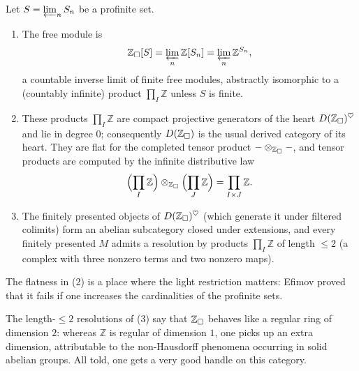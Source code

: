 \begin{proposition}
\label{prop:1:Zsolid-structure}
Let $S=\varprojlim_n S_n$ be a profinite set.
\begin{enumerate}
\item The free module is
\begin{equation}
\label{eq:1:Zsolid-free-module}
\mathbb{Z}_{\square}[S]=\varprojlim_n \mathbb{Z}[S_n]=\varprojlim_n \mathbb{Z}^{S_n},
\end{equation}
a countable inverse limit of finite free modules, abstractly isomorphic to a
(countably infinite) product $\prod_I\mathbb{Z}$ unless $S$ is finite.
\item These products $\prod_I\mathbb{Z}$ are compact projective generators of the
heart $D(\mathbb{Z}_{\square})^{\heartsuit}$ and lie in degree $0$; consequently $D(\mathbb{Z}_{\square})$
is the usual derived category of its heart. They are flat for the completed
tensor product $-\otimes_{\mathbb{Z}_{\square}}-$, and tensor products are computed by the
infinite distributive law
\begin{equation*}
\Bigl(\prod_I\mathbb{Z}\Bigr)\otimes_{\mathbb{Z}_{\square}}\Bigl(\prod_J\mathbb{Z}\Bigr)
=\prod_{I\times J}\mathbb{Z}.
\end{equation*}
\item The finitely presented objects of $D(\mathbb{Z}_{\square})^{\heartsuit}$ (which generate
it under filtered colimits) form an abelian subcategory closed under extensions,
and every finitely presented $M$ admits a resolution by products
$\prod_I\mathbb{Z}$ of length $\leq 2$ (a complex with three nonzero terms and two
nonzero maps).
\end{enumerate}
\end{proposition}

\begin{remark}
\label{rmk:1:lightness-used}
The flatness in (2) is a place where the light
restriction matters: Efimov proved that it fails if one increases the
cardinalities of the profinite sets.
\end{remark}

\begin{remark}
\label{rmk:1:Zsolid-regular-dim-2}
The length-$\leq 2$ resolutions of (3) say that
$\mathbb{Z}_{\square}$ behaves like a regular ring of dimension $2$: whereas $\mathbb{Z}$ is
regular of dimension $1$, one picks up an extra dimension, attributable to the
non-Hausdorff phenomena occurring in solid abelian groups. All told, one gets a
very good handle on this category.
\end{remark}

